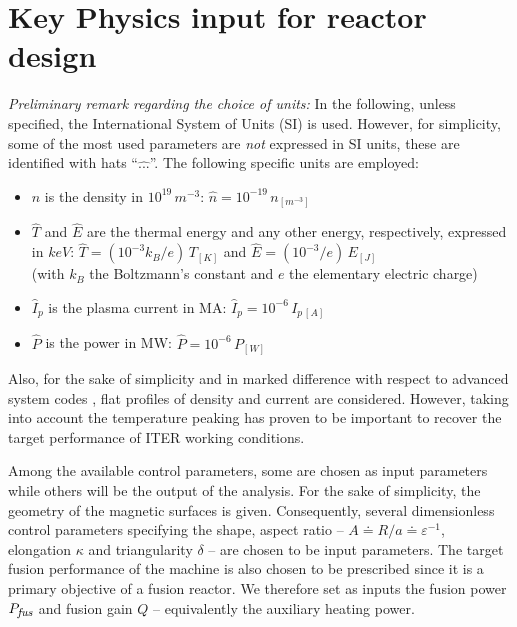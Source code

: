 \documentclass[12pt]{iopart}
\newcommand{\eps}{{\varepsilon}}
\newcommand{\Pfus}{{P_{\textrm{\it\footnotesize fus}}}}
\newcommand{\newstuff}[1]{\color{blue}{#1}\color{black}}
\begin{document}
\section{Key Physics input for reactor design} 
\label{sec:Key Physics input for reactor design}
\emph{Preliminary remark regarding the choice of units:} In the following, unless specified, the International System of Units (SI) is used. However, for simplicity, some of the most used parameters are \emph{not} expressed in SI units, these are identified with hats ``$\widehat{...}$''. The following specific units are employed:
% 
\begin{itemize}
	\item $\widehat n$ is the density in $10^{19}\, {m^{-3}}$: 
	$\widehat n = 10^{-19}\,n_{{[m^{-3}]}}$
	\item $\widehat T$ and $\widehat E$ are the thermal energy and any other energy, respectively, expressed in $keV$: $\widehat T = (10^{-3}k_B/e)\, T_{[K]}$ and $\widehat E = (10^{-3}/e)\, E_{[J]}$\\(with $k_B$ the Boltzmann's constant and $e$ the elementary electric charge)
	\item $\widehat I_p$ is the plasma current in MA: $\widehat I_p = 10^{-6}\, I_{p\,[A]}$
	\item $\widehat P$ is the power in MW: $\widehat P = 10^{-6}\, P_{[W]}$
\end{itemize}
%
\newstuff{In addition, $M$ is the mass in Atomic Mass Unit. } Also, for the sake of simplicity and in marked difference with respect to advanced system codes \cite{Kovari2014,Reux2015}, flat profiles of density and current are considered. However, taking into account the temperature peaking has proven to be important to recover the target performance of ITER working conditions.

Among the available control parameters, some are chosen as input parameters while others will be the output of the analysis. For the sake of simplicity, the geometry of the magnetic surfaces is given. Consequently, several dimensionless control parameters specifying the shape, aspect ratio -- $A\doteq R/a \doteq \eps^{-1}$, elongation $\kappa$ and triangularity $\delta$ -- are chosen to be input parameters. The target fusion performance of the machine is also chosen to be prescribed since it is a primary objective of a fusion reactor. We therefore set as inputs the fusion power $\Pfus$ and fusion gain $Q$ -- equivalently the auxiliary heating power. \\
\end{document}
